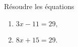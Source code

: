 
\begin{exercice}\label{exo2smath-0242}

    Résoudre les équations
    \begin{enumerate}
        \item
            \( 3x-11=29,\)
        \item
            \( 8x+15=29\).
    \end{enumerate}

\end{exercice}
